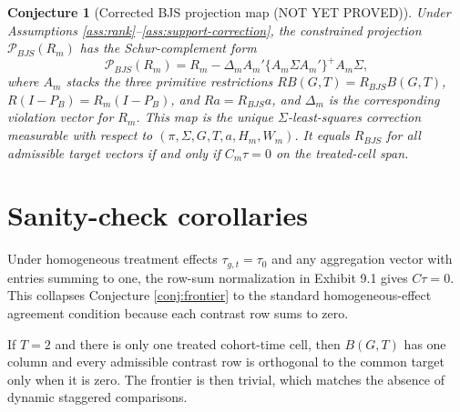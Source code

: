 \documentclass[11pt]{article}
\theoremstyle{definition}
\theoremstyle{plain}
\newtheorem{conjecture}{Conjecture}
\theoremstyle{remark}
\begin{document}
\begin{conjecture}[Corrected BJS projection map (NOT YET PROVED)]\label{conj:projection}
Under Assumptions \ref{ass:rank}--\ref{ass:support-correction}, the constrained projection \(\mathcal P_{BJS}(R_m)\) has the Schur-complement form
\[
\mathcal P_{BJS}(R_m)=R_m-\Delta_m A_m'\{A_m\Sigma A_m'\}^{+}A_m\Sigma,
\]
where \(A_m\) stacks the three primitive restrictions \(RB(G,T)=R_{BJS}B(G,T)\), \(R(I-P_B)=R_m(I-P_B)\), and \(Ra=R_{BJS}a\), and \(\Delta_m\) is the corresponding violation vector for \(R_m\). This map is the unique \(\Sigma\)-least-squares correction measurable with respect to \((\pi,\Sigma,G,T,a,H_m,W_m)\). It equals \(R_{BJS}\) for all admissible target vectors if and only if \(C_m\tau=0\) on the treated-cell span.
\end{conjecture}

\section{Sanity-check corollaries}
Under homogeneous treatment effects \(\tau_{g,t}=\tau_0\) and any aggregation vector with entries summing to one, the row-sum normalization in Exhibit 9.1 gives \(C\tau=0\). This collapses Conjecture \ref{conj:frontier} to the standard homogeneous-effect agreement condition because each contrast row sums to zero.

If \(T=2\) and there is only one treated cohort-time cell, then \(B(G,T)\) has one column and every admissible contrast row is orthogonal to the common target only when it is zero. The frontier is then trivial, which matches the absence of dynamic staggered comparisons.
\end{document}
